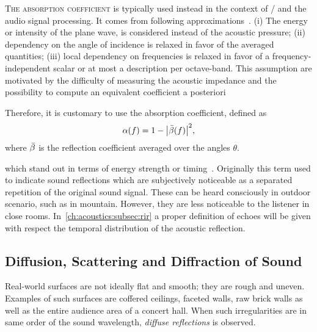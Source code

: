 \textsc{The absorption coefficient} is typically used instead in the context of \GA/ and the audio signal processing.
It comes from following approximations~.
(i) The energy or intensity of the plane wave, is considered instead of the acoustic pressure;
(ii) dependency on the angle of incidence is relaxed in favor of the averaged quantities;
(iii) local dependency on frequencies is relaxed in favor of a frequency-independent scalar or at most a description per octave-band.
This assumption are motivated by the difficulty of measuring the acoustic impedance
and the possibility to compute an equivalent coefficient a posteriori

Therefore, it is customary to use the absorption coefficient, defined as
\begin{equation}
    \absCoeff(f) = 1 - \abs{\bar{\reflCoeff}(f)}^2
    ,
\end{equation}
where $\bar{\beta}$ is the reflection coefficient averaged over the angles $\theta$.

 which stand out in terms of energy strength or timing~.
Originally this term used to indicate sound reflections which are subjectively noticeable as a separated repetition of the original sound signal.
These can be heard consciously in outdoor scenario, such as in mountain. However, they are less noticeable to the listener in close rooms.
In~\cref{ch:acoustics:subsec:rir} a proper definition of echoes will be given with respect the temporal distribution of the acoustic reflection.

\subsection{Diffusion, Scattering and Diffraction of Sound}
Real-world surfaces are not ideally flat and smooth; they are rough and uneven.
Examples of such surfaces are coffered ceilings, faceted walls, raw brick walls as well as the entire audience area of a concert hall.
When such irregularities are in same order of the sound wavelength, \textit{diffuse reflections} is observed.

